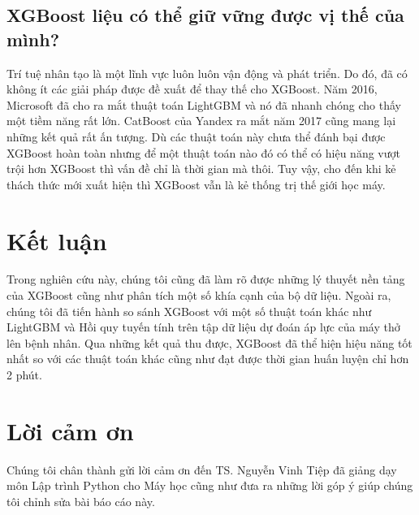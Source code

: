 \documentclass{article}
\begin{document}
\subsection{XGBoost liệu có thể giữ vững được vị thế của mình?}
Trí tuệ nhân tạo là một lĩnh vực luôn luôn vận động và phát triển. Do đó, đã có không ít các giải pháp được đề xuất để thay thế cho XGBoost. Năm 2016, Microsoft đã cho ra mắt thuật toán LightGBM và nó đã nhanh chóng cho thấy một tiềm năng rất lớn. CatBoost của Yandex ra mắt năm 2017 cũng mang lại những kết quả rất ấn tượng. Dù các thuật toán này chưa thể đánh bại được XGBoost hoàn toàn nhưng để một thuật toán nào đó có thể có hiệu năng vượt trội hơn XGBoost thì vấn đề chỉ là thời gian mà thôi. Tuy vậy, cho đến khi kẻ thách thức mới xuất hiện thì XGBoost vẫn là kẻ thống trị thế giới học máy.

\section{Kết luận}
Trong nghiên cứu này, chúng tôi cũng đã làm rõ được những lý thuyết nền tảng của XGBoost cũng như phân tích một số khía cạnh của bộ dữ liệu. Ngoài ra, chúng tôi đã tiến hành so sánh XGBoost với một số thuật toán khác như LightGBM và Hồi quy tuyến tính trên tập dữ liệu dự đoán áp lực của máy thở lên bệnh nhân. Qua những kết quả thu được, XGBoost đã thể hiện hiệu năng tốt nhất so với các thuật toán khác cũng như đạt được thời gian huấn luyện chỉ hơn 2 phút.

\section*{Lời cảm ơn}
Chúng tôi chân thành gửi lời cảm ơn đến TS. Nguyễn Vinh Tiệp đã giảng dạy môn Lập trình Python cho Máy học cũng như đưa ra những lời góp ý giúp chúng tôi chỉnh sửa bài báo cáo này.


\end{document}
